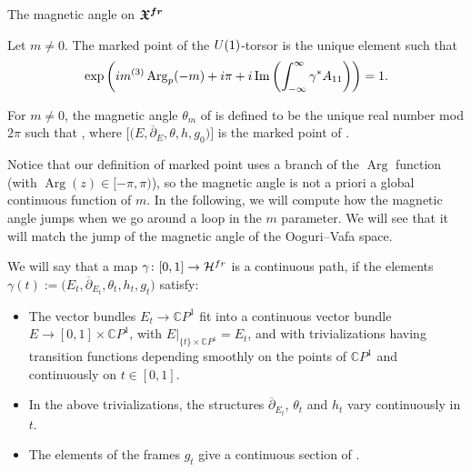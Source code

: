 \documentclass[11pt]{article}
\numberwithin{equation}{section}
\numberwithin{equation}{section}
\newcommand{\CP}{\mathbb{C}P^1}
\begin{document}
\begin{subsubsection}{The magnetic angle on $\boldsymbol{\mathfrak{X}^{{\rm fr}}}$}
\begin{Definition} Let $m\neq 0$. The marked point of the ${\rm U}(1)$-torsor  is the unique element  such that
\begin{equation*}
 \exp \left({\rm i}m^{(3)}\operatorname{Arg}_p(-m)+{\rm i}\pi +{\rm i}\operatorname{Im}\left(\int_{-\infty}^{\infty}\gamma^*A_{11}\right)\right)=1 .
\end{equation*}
\end{Definition}
\begin{Definition}\label{magangledef} For $m \neq 0$, the magnetic angle $\theta_m$ of  is defined to be the unique real number mod $2\pi$ such that
,
where $\bigl[\bigl(E,\overline{\partial}_E,\theta,h,g_0\bigr)\bigr]$ is the marked point of .
\end{Definition}

Notice that our definition of marked point uses a branch of the $\operatorname{Arg}$ function (with $\operatorname{Arg}(z)\in [-\pi,\pi)$), so the magnetic angle is not a priori a global continuous function of $m$. In the following, we will compute how the magnetic angle jumps when we go around a loop in the $m$ parameter. We will see that it will match the jump of the magnetic angle of the Ooguri--Vafa space.

\begin{Definition} We will say that a map $\gamma\colon [0,1]\to \mathcal{H}^{\textnormal{fr}}$ is a continuous path, if the elements~${\gamma(t):=\bigl(E_t,\overline{\partial}_{E_t},\theta_t,h_t,g_t\bigr)}$ satisfy:
\begin{itemize}\itemsep=0pt
 \item The vector bundles $E_t\to \CP$ fit into a continuous vector bundle $E\to [0,1]\times \CP$, with $E|_{\{t\}\times \CP}=E_t$, and with trivializations having transition functions depending smoothly on the points of $\CP$ and continuously on $t\in [0,1]$.
 \item In the above trivializations, the structures $\overline{\partial}_{E_t}$, $\theta_t$ and $h_t$ vary continuously in $t$.
 \item The elements of the frames $g_t$ give a continuous section of .
\end{itemize}


\end{Definition}
\end{subsubsection}
\end{document}
